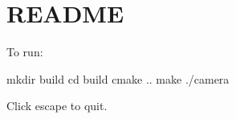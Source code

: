\chapter{README}
\hypertarget{md__r_e_a_d_m_e}{}\label{md__r_e_a_d_m_e}
To run\+: ~\newline


mkdir build cd build cmake .. make ./camera

Click escape to quit. 